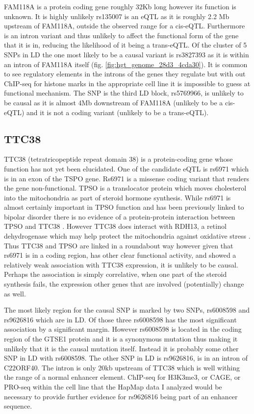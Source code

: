 \documentclass[12pt,a4paper]{article}
\begin{document}
	FAM118A is a protein coding gene roughly 32Kb long however its function is unknown. It is highly unlikely rs135007 is an eQTL as it is roughly 2.2 Mb upstream of FAM118A, outside the observed range for a cis-eQTL. Furthermore is an intron variant and thus unlikely to affect the functional form of the gene that it is in, reducing the likelihood of it being a trans-eQTL. Of the cluster of 5 SNPs in LD the one most likely to be a causal variant is rs3827393 as it is within an intron of FAM118A itself (fig. \ref{fig:hgt_genome_28d3_4cda30}). It is common to see regulatory elements in the introns of the genes they regulate but with out ChIP-seq for histone marks in the appropriate cell line it is impossible to guess at functional mechanism. The SNP is the third LD block, rs5769966, is unlikely to be causal as it is almost 4Mb downstream of FAM118A (unlikely to be a cis-eQTL) and it is not a coding variant (unlikely to be a trans-eQTL).     

\subsection{TTC38}
     TTC38 (tetratricopeptide repeat domain 38) is a protein-coding gene whose function has not yet been elucidated. One of the candidate eQTL is rs6971 which is in an exon of the TSPO gene. Rs6971 is a missense coding variant that renders the gene non-functional. TPSO is a translocator protein which moves cholesterol into the mitochondria as part of steroid hormone synthesis. While rs6971 is almost certainly important in TPSO function and has been previously linked to bipolar disorder there is no evidence of a protein-protein interaction between TPSO and TTC38 \cite{colasanti_bipolar_2013}. However TTC38 does interact with RDH13, a retinol dehydrogenase which may help protect the mitochondria against oxidative stress \cite{franceschini_string_2013}. Thus TTC38 and TPSO are linked in a roundabout way however given that rs6971 is in a coding region, has other clear functional activity, and showed a relatively weak association with TTC38 expression, it is unlikely to be causal. Perhaps the association is simply correlative, when one part of the steroid synthesis fails, the expression other genes that are involved (potentially) change as well.
     
     The most likely region for the causal SNP is marked by two SNPs, rs6008598 and rs9626816 which are in LD. Of those three rs6008598 has the most significant association by a significant margin. However rs6008598 is located in the coding region of the GTSE1 protein and it is a synonymous mutation thus making it unlikely that it is the causal mutation itself. Instead it is probably some other SNP in LD with rs6008598. The other SNP in LD is rs9626816, is in an intron of C22ORF40. The intron is only 20kb upstream of TTC38 which is well withing the range of a normal enhancer element. ChIP-seq for H3K3me3, or CAGE, or PRO-seq within the cell line that the HapMap data I analyzed would be necessary to provide further evidence for rs9626816 being part of an enhancer sequence.                 

\FloatBarrier



\end{document}
